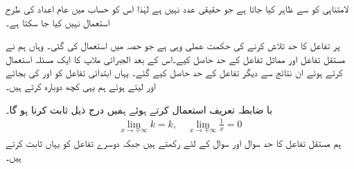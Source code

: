 لامتناہی کو  سے ظاہر کیا جاتا ہے جو حقیقی عدد نہیں ہے لہٰذا اس کو حساب میں عام اعداد کی طرح استعمال نہیں کیا جا سکتا ہے۔ 

 پر تفاعل کا حد تلاش کرنے کی حکمت عملی وہی ہے جو حصہ  میں استعمال کی گئی۔ وہاں ہم نے مستقل تفاعل  اور مماثل تفاعل  کے حد حاصل کیے۔اس کے بعد الجبرائی ملاپ کا ایک مسئلہ استعمال کرتے ہوئے ان نتائج سے دیگر تفاعل کے حد حاصل کیے گئے۔ یہاں ابتدائی تفاعل کو  اور  کی بجائے  اور  لیتے ہوئے ہم یہی کچھ دوبارہ کرتے ہیں۔ 

با ضابطہ  تعریف استعمال کرتے ہوئے ہمیں درج ذیل ثابت کرنا ہو گا۔
\begin{align}\label{مساوات_استعمال_معکوس_حد}
\lim_{x\to \mp \infty} k=k,\quad \lim_{x\to \mp \infty}\frac{1}{x}=0
\end{align}
ہم مستقل تفاعل کا حد سوال  اور سوال  کے لئے  رکھتے ہیں جبکہ دوسرے تفاعل کو یہاں ثابت کرتے ہیں۔

